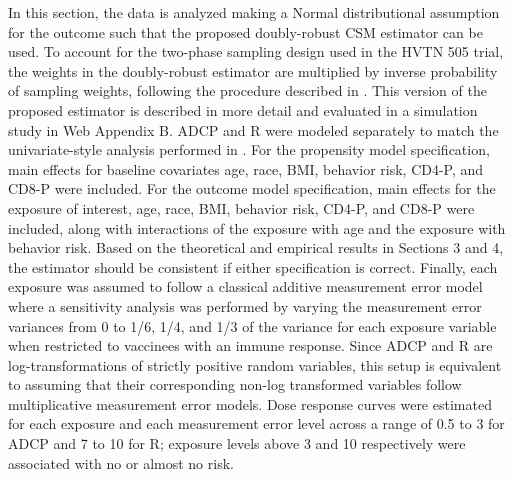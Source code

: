 \documentclass[useAMS,usenatbib,referee]{biom}
\newcommand{\RNum}[1]{\uppercase\expandafter{\romannumeral #1\relax}}
\begin{document}
In this section, the data is analyzed making a Normal distributional assumption for the outcome such that the proposed doubly-robust CSM estimator can be used. To account for the two-phase sampling design used in the HVTN 505 trial, the weights in the doubly-robust estimator are multiplied by inverse probability of sampling weights, following the procedure described in \citet{wang2009}. This version of the proposed estimator is described in more detail and evaluated in a simulation study in Web Appendix B. ADCP and R\RNum{2} were modeled separately to match the univariate-style analysis performed in \citet{neidich2019}. For the propensity model specification, main effects for baseline covariates age, race, BMI, behavior risk, CD4-P, and CD8-P were included. For the outcome model specification, main effects for the exposure of interest, age, race, BMI, behavior risk, CD4-P, and CD8-P were included, along with interactions of the exposure with age and the exposure with behavior risk. Based on the theoretical and empirical results in Sections 3 and 4, the estimator should be consistent if either specification is correct. Finally, each exposure was assumed to follow a classical additive measurement error model where a sensitivity analysis was performed by varying the measurement error variances from 0 to 1/6, 1/4, and 1/3 of the variance for each exposure variable when restricted to vaccinees with an immune response. Since ADCP and R\RNum{2} are log-transformations of strictly positive random variables, this setup is equivalent to assuming that their corresponding non-log transformed variables follow multiplicative measurement error models. Dose response curves were estimated for each exposure and each measurement error level across a range of 0.5 to 3 for ADCP and 7 to 10 for R\RNum{2}; exposure levels above 3 and 10 respectively were associated with no or almost no risk.
\end{document}
